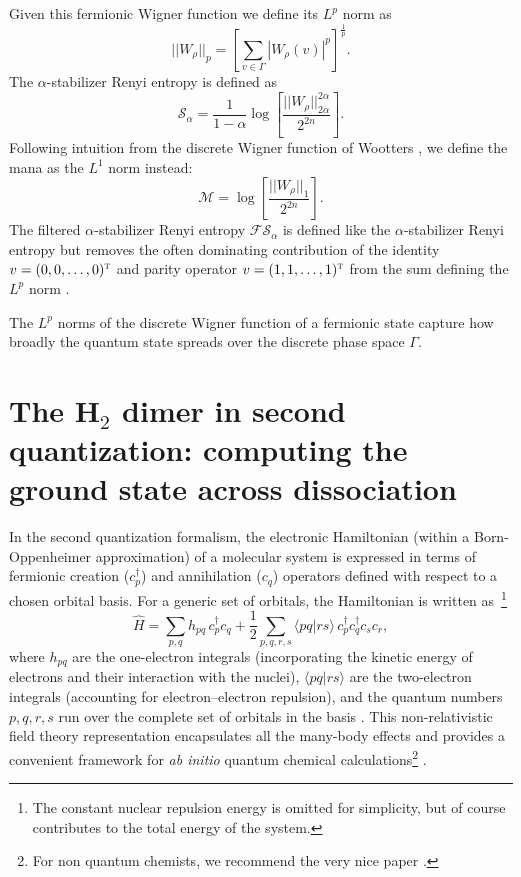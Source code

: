 \documentclass[aps, prl, twocolumn, groupedaddress, reprint, floatfix, nofootinbib, longbibliography]{revtex4-2}
\begin{document}
    Given this fermionic Wigner function we define its $L^p$ norm as
    \begin{equation}
        || W_\rho ||_p = \left[\sum_{v\in\Gamma} | W_\rho(v) |^p\right]^{\frac{1}{p}}.
    \end{equation}
    The $\alpha$-stabilizer Renyi entropy is defined as
    \begin{equation}
        \mathcal S_\alpha = \frac{1}{1-\alpha}\log\left[\frac{|| W_\rho ||_{2\alpha}^{2\alpha}}{2^{2n}}\right].
    \end{equation}
    Following intuition from the discrete Wigner function of Wootters \cite{wootters1987wigner, gibbons2004discrete}, we define the mana as the $L^1$ norm instead:
    \begin{equation}
        \mathcal M = \log\left[\frac{|| W_\rho ||_{1}}{2^{2n}}\right].
    \end{equation}
    The filtered $\alpha$-stabilizer Renyi entropy $\mathcal{FS}_\alpha$ is defined like the $\alpha$-stabilizer Renyi entropy but removes the often dominating contribution of the identity $v = (0, 0, \dots, 0)^\textsc{t}$ and parity operator $v = (1, 1, \dots, 1)^\textsc{t}$ from the sum defining the $L^{p}$ norm \cite{collura2024quantum}.

    The $L^p$ norms of the discrete Wigner function of a fermionic state capture how broadly the quantum state spreads over the discrete phase space $\Gamma$.

\section{The \texorpdfstring{H$_2$}{H2} dimer in second quantization: computing the ground state across dissociation}

    In the second quantization formalism, the electronic Hamiltonian (within a Born-Oppenheimer approximation) of a molecular system is expressed in terms of fermionic creation (\(c_p^\dagger\)) and annihilation (\(c_q\)) operators defined with respect to a chosen orbital basis. For a generic set of orbitals, the Hamiltonian is written as~\footnote{The constant nuclear repulsion energy is omitted for simplicity, but of course contributes to the total energy of the system.}
    \begin{equation}
    \hat{H} = \sum_{p,q} h_{pq}\, c_p^\dagger c_q + \frac{1}{2} \sum_{p,q,r,s} \langle pq \vert rs \rangle\, c_p^\dagger c_q^\dagger c_s c_r,
    \end{equation}
    where $h_{pq}$ are the one-electron integrals (incorporating the kinetic energy of electrons and their interaction with the nuclei), $\langle pq \vert rs \rangle$ are the two-electron integrals (accounting for electron--electron repulsion), and the quantum numbers $p, q, r, s$ run over the complete set of orbitals in the basis \cite{mcweeny1989method, cramer2013essentials}. This non-relativistic field theory representation encapsulates all the many-body effects and provides a convenient framework for \textit{ab initio} quantum chemical calculations\footnote{For non quantum chemists, we recommend the very nice paper \cite{graves2023electronic}.} \cite{szabo1996modern, helgaker2013molecular}.
\end{document}
